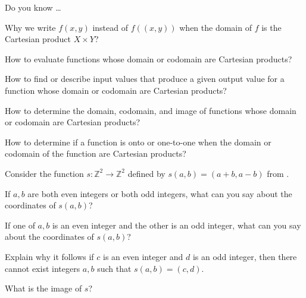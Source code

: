 \begin{exer}[\exerR] %
\label{exer_dyk_cart_prod_fns}
    Do you know \ldots
        \begin{exerpart}
            \item Why we write $f(x,y)$ instead of $f((x,y))$ when the domain of $f$ is the Cartesian product $X \times Y$?
            \item How to evaluate functions whose domain or codomain are Cartesian products?
            \item How to find or describe input values that produce a given output value for a function whose domain or codomain are Cartesian products?
            \item How to determine the domain, codomain, and image of functions whose domain or codomain are Cartesian products?
            \item How to determine if a function is onto or one-to-one when the domain or codomain of the function are Cartesian products?
        \end{exerpart}
\end{exer}

\begin{exer}[\exerE] %
\label{exer_fn_integer_lattice_again}
    Consider the function $s: \mathbb{Z}^2 \to \mathbb{Z}^2$ defined by $s(a,b) = (a+b,a-b)$ from .
        \begin{exerpart}
            \item If $a,b$ are both even integers or both odd integers, what can you say about the coordinates of $s(a,b)$?
            \item If one of $a,b$ is an even integer and the other is an odd integer, what can you say about the coordinates of $s(a,b)$?
            \item Explain why it follows if $c$ is an even integer and $d$ is an odd integer, then there cannot exist integers $a,b$ such that $s(a,b) = (c,d)$.
            \item What is the image of $s$?
        \end{exerpart}
\end{exer}

